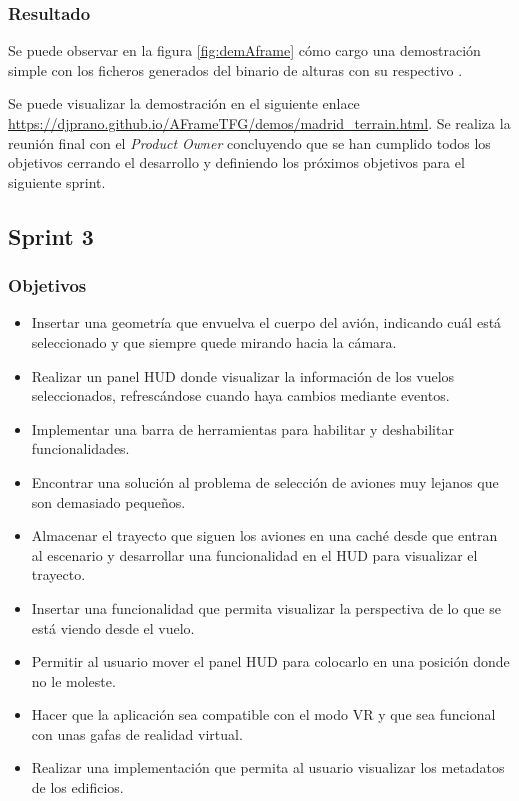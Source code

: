 \documentclass[a4paper, 11pt]{book}
\begin{document}
\subsubsection{Resultado}
Se puede observar en la figura \ref{fig:demAframe} cómo cargo una demostración simple con los ficheros generados del binario de alturas con su respectivo . 

Se puede visualizar la demostración en el siguiente enlace \url{https://djprano.github.io/AFrameTFG/demos/madrid_terrain.html}.
Se realiza la reunión final con el \emph{Product Owner} concluyendo que se han cumplido todos los objetivos cerrando el desarrollo y definiendo los próximos objetivos para el siguiente sprint.
\subsection{Sprint 3}
\subsubsection{Objetivos}
\begin{itemize}
    \item Insertar una geometría que envuelva el cuerpo del avión, indicando cuál está seleccionado y que siempre quede mirando hacia la cámara.
    \item Realizar un panel \textsc{\gls{HUD}} donde visualizar la información de los vuelos seleccionados, refrescándose cuando haya cambios mediante eventos.
    \item Implementar una barra de herramientas para habilitar y deshabilitar funcionalidades.
    \item Encontrar una solución al problema de selección de aviones muy lejanos que son demasiado pequeños.
    \item Almacenar el trayecto que siguen los aviones en una caché desde que entran al escenario y desarrollar una funcionalidad en el \textsc{\gls{HUD}} para visualizar el trayecto.
    \item Insertar una funcionalidad que permita visualizar la perspectiva de lo que se está viendo desde el vuelo.
    \item Permitir al usuario mover el panel \textsc{\gls{HUD}} para colocarlo en una posición donde no le moleste.
    \item Hacer que la aplicación sea compatible con el modo VR y que sea funcional con unas gafas de realidad virtual.
    \item Realizar una implementación que permita al usuario visualizar los metadatos de los edificios.
\end{itemize}
\end{document}
